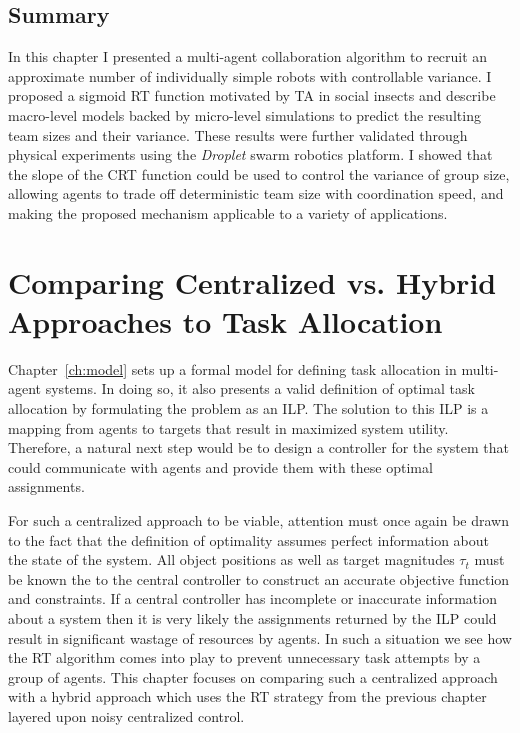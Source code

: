 \documentclass[defaultstyle,12pt]{thesis}
\begin{document}
\section{Summary}
In this chapter I presented a multi-agent collaboration algorithm to recruit an approximate number of individually simple robots with controllable variance. I proposed a sigmoid RT function motivated by TA in social insects and describe macro-level models backed by micro-level simulations to predict the resulting team sizes and their variance.  These results were further validated through physical experiments using the \emph{Droplet} swarm robotics platform. I showed that the slope of the CRT function could be used to control the variance of group size, allowing agents to trade off deterministic team size with coordination speed, and making the proposed mechanism applicable to a variety of applications.


\chapter{Comparing Centralized vs. Hybrid Approaches to Task Allocation}
Chapter~\ref{ch:model} sets up a formal model for defining task allocation in multi-agent systems. In doing so, it also presents a valid definition of optimal task allocation by formulating the problem as an ILP. The solution to this ILP is a mapping from agents to targets that result in maximized system utility. Therefore, a natural next step would be to design a controller for the system that could communicate with agents and provide them with these optimal assignments.

For such a centralized approach to be viable, attention must once again be drawn to the fact that the definition of optimality assumes perfect information about the state of the system. All object positions as well as target magnitudes $\tau_t$ must be known the to the central controller to construct an accurate objective function and constraints. If a central controller has incomplete or inaccurate information about a system then it is very likely the assignments returned by the ILP could result in significant wastage of resources by agents. In such a situation we see how the RT algorithm comes into play to prevent unnecessary task attempts by a group of agents.  This chapter focuses on comparing such a centralized approach with a hybrid approach which uses the RT strategy from the previous chapter layered upon noisy centralized control.
\end{document}
